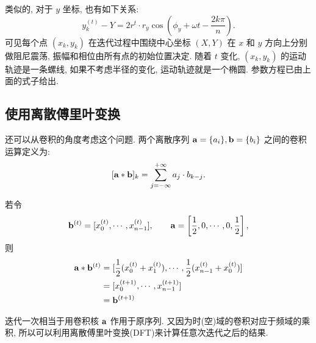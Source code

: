 类似的, 对于 $y$ 坐标, 也有如下关系:
\[ y_k^{(t)} - Y = 2r^t\cdot r_y\cos(\phi_y+\omega t-\frac{2k\pi}{n}).\]
可见每个点 $(x_k, y_k)$ 在迭代过程中围绕中心坐标 $(X,Y)$ 在 $x$ 和 $y$ 方向上分别做阻尼震荡, 振幅和相位由所有点的初始位置决定. 随着 $t$ 变化, $(x_k, y_k)$ 的运动轨迹是一条螺线, 如果不考虑半径的变化, 运动轨迹就是一个椭圆. 参数方程已由上面的式子给出.

\subsection{使用离散傅里叶变换}
还可以从卷积的角度考虑这个问题. 两个离散序列 $\bold{a}=\{a_i\}, \bold{b}=\{b_i\}$ 之间的卷积运算定义为:
$$ [\bold{a}*\bold{b}]_k = \sum_{j=-\infty}^{+\infty} {a_j\cdot b_{k-j}} .$$

若令 
$$\bold{b}^{(t)}=[x_0^{(t)}, \cdots, x_{n-1}^{(t)}], \qquad \bold{a}=\left[\dfrac{1}{2}, 0, \cdots, 0, \dfrac{1}{2}\right], $$
则 
\begin{align*}
\bold{a}*\bold{b}^{(t)} &= [ \frac{1}{2} (x_0^{(t)} + x_1^{(t)}), \cdots, \frac{1}{2} (x_{n-1}^{(t)} + x_0^{(t)}) ] \\
&= [x_0^{(t+1)}, \cdots, x_{n-1}^{(t+1)}] \\
&= \bold{b}^{(t+1)} 
\end{align*}

迭代一次相当于用卷积核 $\bold{a}$ 作用于原序列. 又因为时(空)域的卷积对应于频域的乘积, 所以可以利用离散傅里叶变换(DFT)来计算任意次迭代之后的结果.

